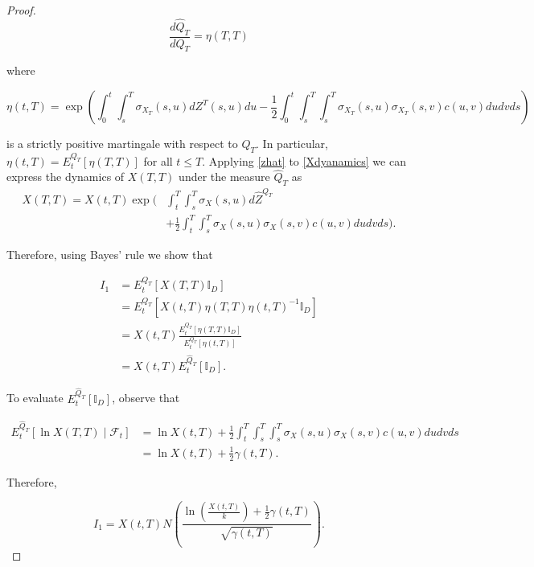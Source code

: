 \documentclass[11pt]{article}
\newcommand{\filt}{\ensuremath{\mathcal{F}}}
\begin{document}
\begin{proof}
\begin{equation*}
    \frac{d\hat{Q}_T}{dQ_T}=\eta(T,T)
\end{equation*}

where 

\begin{equation*}
    \eta(t,T)=\exp\left(\int_0^t\int_s^T \sigma_{X_T}(s,u)dZ^T(s,u)du
    -\frac{1}{2}\int_0^t\int_s^T\int_s^T \sigma_{X_T}(s,u)\sigma_{X_T}(s,v)c(u,v)dudvds\right)
\end{equation*}

is a strictly positive martingale with respect to $Q_T$. In particular, $\eta(t,T)=E^{Q_T}_t[\eta(T,T)]$ for all $t\leq T.$
Applying \eqref{zhat} to \eqref{Xdyanamics} we can express the dynamics of $X(T,T)$ under the measure $\hat{Q}_T$ as 
\begin{equation}
    \begin{split}
         X(T,T)=X(t,T)\exp\Bigg( &\int_t^T\int_s^T \sigma_X(s,u)d\hat{Z}^{Q_T}\\
 &+\frac{1}{2}\int_t^T \int_s^T \sigma_X(s,u)\sigma_X(s,v)c(u,v)dudvds\Bigg).
    \end{split}
\end{equation}


Therefore, using Bayes' rule we show that 

\begin{equation*}
\begin{split}
    I_1&=E^{Q_T}_t[X(T,T)\mathbb{I}_D]\\
    &= E^{Q_T}_t[X(t,T)\eta(T,T)\eta(t,T)^{-1}\mathbb{I}_D]\\
    &=X(t,T)\frac{E^{Q_T}_t[\eta(T,T)\mathbb{I}_D]}{E^{Q_T}_t[\eta(t,T)]}\\
    &=X(t,T)E^{\hat{Q}_T}_t[\mathbb{I}_D].
\end{split}
\end{equation*}

To evaluate $E^{\hat{Q}_T}_t[\mathbb{I}_D]$, observe that


\begin{equation}\label{lnxexp}
    \begin{split}
        E^{\hat{Q}_T}_t[\ln X(T,T)\mid \filt_t]&=\ln X(t,T)+\frac{1}{2}\int_t^T\int_s^T\int_s^T \sigma_X(s,u)\sigma_X(s,v)c(u,v)dudvds\\
        &=\ln X(t,T)+\frac{1}{2}\gamma(t,T).
    \end{split}
\end{equation}

Therefore,

\begin{equation*}
    I_1=X(t,T)N\left(\frac{\ln\left(\frac{X(t,T)}{k}\right)+\frac{1}{2}\gamma(t,T)}{\sqrt{\gamma(t,T)}}\right).
\end{equation*}



\end{proof}





\printbibliography
\end{document}
